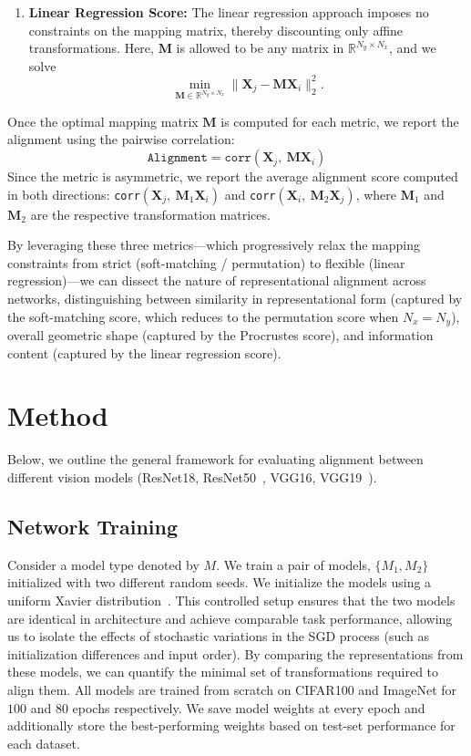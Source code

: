 \documentclass[10pt,letterpaper]{article}
\begin{document}
\begin{enumerate}
    \item \textbf{Linear Regression Score:}  
    The linear regression approach imposes no constraints on the mapping matrix, thereby discounting only affine transformations. Here, \(\bm{M}\) is allowed to be any matrix in \(\mathbb{R}^{N_y \times N_x}\), and we solve
    \[
    \min_{\bm{M} \in \mathbb{R}^{N_y \times N_x}} \|\bm{X}_j - \bm{M}\bm{X}_i\|_2^2.
    \]
\end{enumerate}

Once the optimal mapping matrix \(\bm{M}\) is computed for each metric, we report the alignment using the pairwise correlation:
\[
\texttt{Alignment} = \texttt{corr}\left(\bm{X}_j,\ \bm{M}\bm{X}_i\right)
\]
Since the metric is asymmetric, we report the average alignment score computed in both directions: \texttt{corr}$\left(\bm{X}_j,\  \bm{M}_1\bm{X}_{i}\right)$ and \texttt{corr}$\left(\bm{X}_i,\ \bm{M}_2\bm{X}_{j}\right)$, where $\bm{M}_1$ and $\bm{M}_2$ are the respective transformation matrices.

\noindent
By leveraging these three metrics---which progressively relax the mapping constraints from strict (soft-matching / permutation) to flexible (linear regression)---we can dissect the nature of representational alignment across networks, distinguishing between similarity in representational form (captured by the soft-matching score, which reduces to the permutation score when \(N_x = N_y\)), overall geometric shape (captured by the Procrustes score), and information content (captured by the linear regression score).

\section{Method}
Below, we outline the general framework for evaluating alignment between different vision models (ResNet18, ResNet50~\citep{he2016deep}, VGG16, VGG19~\citep{simonyan2014very}).
\subsection{Network Training}
Consider a model type denoted by $M$. We train a pair of models, $\{M_1, M_2\}$ initialized with two different random seeds. We initialize the models using a uniform Xavier distribution~\citep{glorot2010understanding}. This controlled setup ensures that the two models are identical in architecture and achieve comparable task performance, allowing us to isolate the effects of stochastic variations in the SGD process (such as initialization differences and input order). By comparing the representations from these models, we can quantify the minimal set of transformations required to align them. All models are trained from scratch on CIFAR100 and ImageNet for $100$ and $80$ epochs respectively. We save model weights at every epoch and additionally store the best-performing weights based on test-set performance for each dataset.
\end{document}
